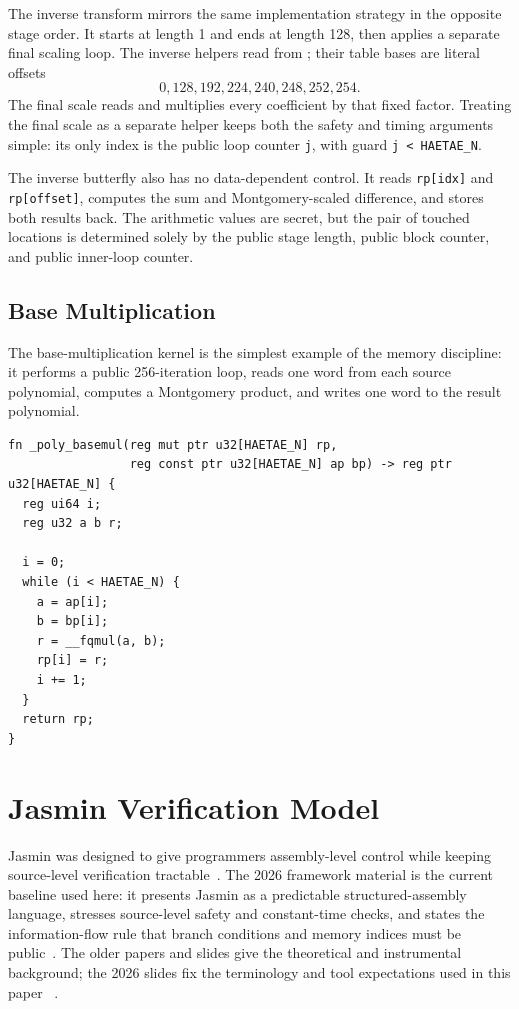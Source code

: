 \documentclass[10pt,twocolumn]{article}
\newcommand{\jasmin}{Jasmin}
\newcommand{\ct}{constant-time}
\begin{document}
The inverse transform mirrors the same implementation strategy in the opposite
stage order.  It starts at length 1 and ends at length 128, then applies a
separate final scaling loop.  The inverse helpers read from
; their table bases are literal offsets
\[
  0,128,192,224,240,248,252,254.
\]
The final scale reads  and multiplies every coefficient
by that fixed factor.  Treating the final scale as a separate helper keeps both
the safety and timing arguments simple: its only index is the public loop
counter \texttt{j}, with guard \texttt{j < HAETAE\_N}.

The inverse butterfly also has no data-dependent control.  It reads
\texttt{rp[idx]} and \texttt{rp[offset]}, computes the sum and Montgomery-scaled
difference, and stores both results back.  The arithmetic values are secret,
but the pair of touched locations is determined solely by the public stage
length, public block counter, and public inner-loop counter.

\subsection{Base Multiplication}

The base-multiplication kernel is the simplest example of the memory discipline:
it performs a public 256-iteration loop, reads one word from each source
polynomial, computes a Montgomery product, and writes one word to the result
polynomial.

\begin{lstlisting}[caption={Base multiplication in \texttt{poly.jinc}.},label={lst:basemul}]
fn _poly_basemul(reg mut ptr u32[HAETAE_N] rp,
                 reg const ptr u32[HAETAE_N] ap bp) -> reg ptr u32[HAETAE_N] {
  reg ui64 i;
  reg u32 a b r;

  i = 0;
  while (i < HAETAE_N) {
    a = ap[i];
    b = bp[i];
    r = __fqmul(a, b);
    rp[i] = r;
    i += 1;
  }
  return rp;
}
\end{lstlisting}

\section{Jasmin Verification Model}

\jasmin{} was designed to give programmers assembly-level control while keeping
source-level verification tractable~\cite{Jasmin2017,LastMile2020}.  The 2026
framework material is the current baseline used here: it presents \jasmin{} as
a predictable structured-assembly language, stresses source-level safety and
\ct{} checks, and states the information-flow rule that branch conditions and
memory indices must be public~\cite{JasminFramework2026}.  The older papers and
slides give the theoretical and instrumental background; the 2026 slides fix
the terminology and tool expectations used in this paper
~\cite{JasminWorkshop2021,JasminWorkbench2023,JasminCourse2024}.
\end{document}
